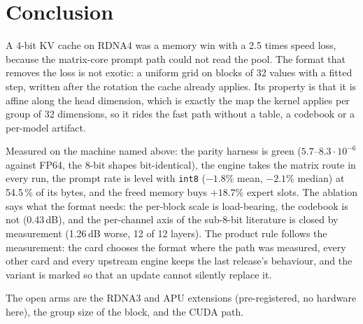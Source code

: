 \documentclass[10pt,twocolumn]{article}
\begin{document}
\section{Conclusion}

A 4-bit KV cache on RDNA4 was a memory win with a 2.5 times speed loss, because the matrix-core prompt
path could not read the pool. The format that removes the loss is not exotic: a uniform grid on blocks of
32 values with a fitted step, written after the rotation the cache already applies. Its property is that
it is affine along the head dimension, which is exactly the map the kernel applies per group of 32
dimensions, so it rides the fast path without a table, a codebook or a per-model artifact.

Measured on the machine named above: the parity harness is green ($5.7$--$8.3\cdot10^{-6}$ against FP64,
the 8-bit shapes bit-identical), the engine takes the matrix route in every run, the prompt rate is level
with \texttt{int8} ($-1.8\%$ mean, $-2.1\%$ median) at 54.5\,\% of its bytes, and the freed memory buys
\textbf{$+18.7\%$} expert slots. The ablation says what the format needs: the per-block scale is
load-bearing, the codebook is not (0.43\,dB), and the per-channel axis of the sub-8-bit literature is
closed by measurement (1.26\,dB worse, 12 of 12 layers). The product rule follows the measurement: the
card chooses the format where the path was measured, every other card and every upstream engine keeps the
last release's behaviour, and the variant is marked so that an update cannot silently replace it.

The open arms are the RDNA3 and APU extensions (pre-registered, no hardware here), the group size of the
block, and the CUDA path.
\end{document}
